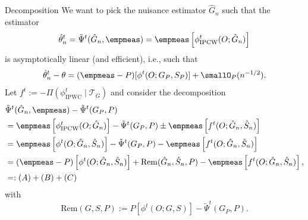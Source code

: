 \documentclass[handout]{beamer}\usepackage{listings}
\begin{document}
\begin{frame}[label={sec:org0101e5d}]{Decomposition}
\small
We want to pick the nuisance estimator $\hat G_n$ such that the estimator
\begin{equation*}
  \hat{\theta}^t_n = \tilde{\Psi}^t(\hat G_n, \empmeas) =
  \empmeas
  \left[
    \phi^t_{\mathrm{IPCW}}(O; \hat{G}_n)
  \right]
\end{equation*}
is asymptotically linear (and efficient), i.e., such that
\begin{equation*}
  \hat{\theta}^t_n - \theta = (\empmeas-P)[\phi^t(O;G_P, S_P)] + \smallO_P(n^{-1/2}).
\end{equation*}
\pause Let $f^t:= -\Pi(\phi^t_{\mathrm{IPWC}} \mid \mathcal{T}_G)$ and consider
the decomposition
\begin{align*}
  & \tilde{\Psi}^t(\hat G_n, \empmeas) - \tilde{\Psi}^t(G_P, P)
  \\ & = \empmeas
       \left[
       \phi^t_{\mathrm{IPCW}}(O; \hat{G}_n)
       \right] - \tilde{\Psi}^t(G_P, P)
       \pm \empmeas
       \left[
       f^t(O; \hat{G}_n, \hat{S}_n)
       \right]
  \\ & = \empmeas
       \left[
       \phi^t(O; \hat{G}_n, \hat{S}_n)
       \right] - \tilde{\Psi}^t(G_P, P)
       - \empmeas
       \left[
       f^t(O; \hat{G}_n, \hat{S}_n)
       \right]
  \\ & = (\empmeas-P)
       \left[
       \phi^t(O; \hat{G}_n, \hat{S}_n)
       \right] 
       +\mathrm{Rem}(\hat{G}_n, \hat{S}_n, P)
       - \empmeas
       \left[
       f^t(O; \hat{G}_n, \hat{S}_n)
       \right],
       \\ & =: (A) + (B) + (C)
\end{align*}
with
\begin{equation*}
  \mathrm{Rem}(G, S, P) := P[\phi^t(O ; G, S)] - \tilde{\Psi}^t(G_P, P).
\end{equation*}
\end{frame}
\end{document}
